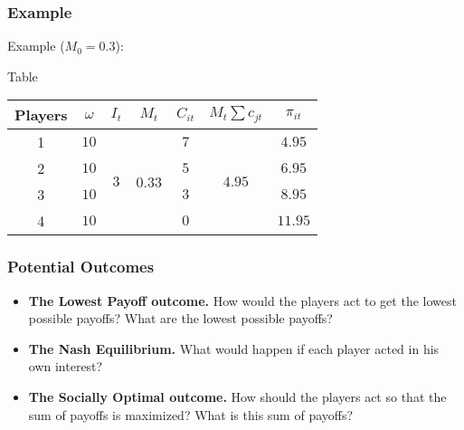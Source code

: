 	\begin{frame}
		\frametitle{Example} 
		Example ($M_0 = 0.3$):
		\begin{block}{Table}
			\begin{center}
				\begin{tabular}{ | c | c | c | c | c | c | c |}
					\hline
					Players	& $\omega$	& $I_t$						& $M_t$					& $C_{it}$	& $M_t \sum c_{jt}$			& $\pi_{it}$	\\ \hline
					1		& $10$		& \multirow{4}{*}{$3$}		& \multirow{4}{*}{0.33}	& $7$		& \multirow{4}{*}{$4.95$}	& $4.95$		\\ 
					2		& $10$		& 							&						& $5$		&							& $6.95$		\\ 
					3		& $10$		& 							&						& $3$		&							& $8.95$		\\ 
					4		& $10$		& 							&						& $0$		&							& $11.95$		\\ \hline
				\end{tabular}
			\end{center}
		\end{block}
	\end{frame}

	\begin{frame}
		\frametitle{Potential Outcomes} 

		\begin{itemize}
			\item
				\textbf{The Lowest Payoff outcome.}
				How would the players act to get the lowest possible payoffs?
				What are the lowest possible payoffs?
			\item
				\textbf{The Nash Equilibrium.}
				What would happen if each player acted in his own interest?
			\item 
				\textbf{The Socially Optimal outcome.}
				How should the players act so that the sum of payoffs is maximized?
				What is this sum of payoffs?
		\end{itemize}
	\end{frame}